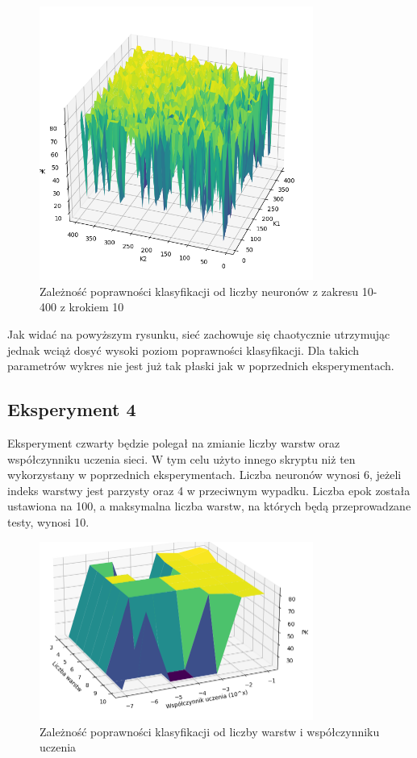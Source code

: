 \documentclass{article}
\begin{document}
\begin{figure}[H]
    \centering
    \includegraphics[width=0.8\textwidth, keepaspectratio]{k1_k2_3.png}
    \caption{Zależność poprawności klasyfikacji od liczby neuronów z zakresu 10-400 z krokiem 10}
    \label{fig:k1k2_3}
\end{figure}

Jak widać na powyższym rysunku, sieć zachowuje się chaotycznie utrzymując jednak wciąż dosyć wysoki poziom poprawności klasyfikacji.
Dla takich parametrów wykres nie jest już tak płaski jak w poprzednich eksperymentach.

\newpage
\subsection{Eksperyment 4}
Eksperyment czwarty będzie polegał na zmianie liczby warstw oraz współczynniku uczenia sieci.
W tym celu użyto innego skryptu niż ten wykorzystany w poprzednich eksperymentach.
Liczba neuronów wynosi 6, jeżeli indeks warstwy jest parzysty oraz 4 w przeciwnym wypadku.
Liczba epok została ustawiona na 100, a maksymalna liczba warstw, na których będą przeprowadzane testy, wynosi 10.

\begin{figure}[H]
    \centering
    \includegraphics[width=0.8\textwidth, keepaspectratio]{LR_LAYERS_100ECHO.PNG}
    \caption{Zależność poprawności klasyfikacji od liczby warstw i współczynniku uczenia}
    \label{fig:lr_layers_1}
\end{figure}
\end{document}
